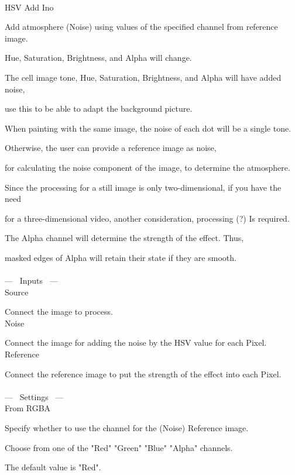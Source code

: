 \documentclass[a4paper,12pt]{article}
\begin{document}
\thispagestyle{empty}

\Large
\noindent \\
HSV Add Ino\medskip
\par
\normalsize
Add atmosphere (Noise) using values of the specified channel from reference image.\par
Hue, Saturation, Brightness, and Alpha will change.\\
\par
The cell image tone, Hue, Saturation, Brightness, and Alpha will have added noise,\par
use this to be able to adapt the background picture.\par
When painting with the same image, the noise of each dot will be a single tone.\par
Otherwise, the user can provide a reference image as noise,\par
for calculating the noise component of the image, to determine the atmosphere.
\\
\par
Since the processing for a still image is only two-dimensional, if you have the need\par
for a three-dimensional video, another consideration, processing (?) Is required.\\
\par
The Alpha channel will determine the strength of the effect. Thus,\par
masked edges of Alpha will retain their state if they are smooth.\\
\\
--- \ Inputs \ ---\\
Source\par
Connect the image to process.\\
Noise\par
Connect the image for adding the noise by the HSV value for each Pixel.\\
Reference\par
Connect the reference image to put the strength of the effect into each Pixel.\\
\\
--- \ Settings \ ---\\
From RGBA\par
Specify whether to use the channel for the (Noise) Reference image.\par
Choose from one of the "Red" "Green" "Blue" "Alpha" channels.\par
The default value is "Red".\\
\end{document}
